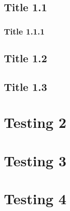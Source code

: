 \documentclass[12pt,a4paper]{article}
\begin{document}
\subsection{Title 1.1}

\subsubsection{Title 1.1.1}

\lipsum[1-20]

\newpage
\subsection{Title 1.2}

\lipsum[1-20]

\newpage
\subsection{Title 1.3}

\begin{multicols}{2}
\lipsum[1-40]
\end{multicols}

\newpage
\section{Testing 2}

\begin{multicols}{3}
\lipsum[1-40]
\end{multicols}


\newpage
\section{Testing 3}

\begin{multicols}{4}
\lipsum[1-40]
\end{multicols}


\newpage
\section{Testing 4}
\begin{multicols}{5}
\lipsum[1-40]
\end{multicols}



\newpage
\begin{thebibliography}{7}
\end{thebibliography}
\end{document}
